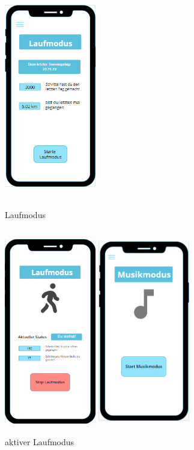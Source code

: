 \documentclass[a4paper,12pt]{article}
\begin{document}
\begin{figure}[ht!]
	\centering
		\begin{minipage}{0.4\textwidth}
			\includegraphics[width=4cm,height=9cm]{./Benutzeroberflaeche/Laufmodus.png}
			\caption{Laufmodus}
			\vspace{30px}
		\end{minipage}
			\hfill
		\begin{minipage}{0.4\textwidth}
			\includegraphics[width=4cm,height=9cm]{./Benutzeroberflaeche/Laufmodus_aktiv.png}
			\caption{aktiver Laufmodus}
			\vspace{30px}
		\end{minipage}
		\begin{minipage}{0.4\textwidth}
			\includegraphics[width=4cm,height=9cm]{./Benutzeroberflaeche/Musikmodus.png}

\end{minipage}
\end{figure}
\end{document}
